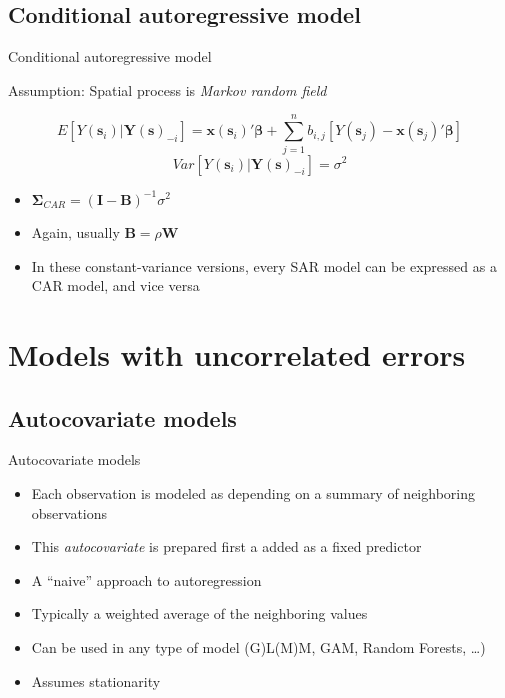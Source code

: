 \documentclass[
  ignorenonframetext,
]{beamer}
\providecommand{\tightlist}{%
  \setlength{\itemsep}{0pt}\setlength{\parskip}{0pt}}
\begin{document}
\hypertarget{conditional-autoregressive-model}{%
\subsection{Conditional autoregressive
model}\label{conditional-autoregressive-model}}

\begin{frame}{Conditional autoregressive model}
\small

Assumption: Spatial process is \emph{Markov random field}

\[E[Y(\boldsymbol{s}_i)|\boldsymbol{Y}(\boldsymbol{s})_{-i}]=\boldsymbol{x}(\boldsymbol{s}_i)'\boldsymbol{\beta} + \sum_{j=1}^nb_{i,j}[Y(\boldsymbol{s}_j) - \boldsymbol{x}(\boldsymbol{s}_j)'\boldsymbol{\beta}]\]
\[Var[Y(\boldsymbol{s}_i)|\boldsymbol{Y}(\boldsymbol{s})_{-i}] = \sigma^2\]

\begin{itemize}
\tightlist
\item
  \(\boldsymbol{\Sigma}_{CAR}=(\boldsymbol{I}-\boldsymbol{B})^{-1}\sigma^2\)
\item
  Again, usually \(\boldsymbol{B} = \rho\boldsymbol{W}\)
\item
  In these constant-variance versions, every SAR model can be expressed
  as a CAR model, and vice versa
\end{itemize}
\end{frame}

\hypertarget{models-with-uncorrelated-errors}{%
\section{Models with uncorrelated
errors}\label{models-with-uncorrelated-errors}}

\hypertarget{autocovariate-models}{%
\subsection{Autocovariate models}\label{autocovariate-models}}

\begin{frame}{Autocovariate models}
\small

\begin{itemize}
\item
  Each observation is modeled as depending on a summary of neighboring
  observations
\item
  This \emph{autocovariate} is prepared first a added as a fixed
  predictor
\item
  A ``naive'' approach to autoregression
\item
  Typically a weighted average of the neighboring values
\item
  Can be used in any type of model (G)L(M)M, GAM, Random Forests,
  \ldots)
\item
  Assumes stationarity
\end{itemize}
\end{frame}
\end{document}
